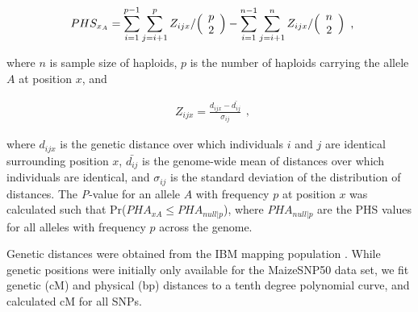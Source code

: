 \begin{equation}
  \label{phs-1}
  \begin{array}{l}
  \displaystyle{
PHS_{x_A} = \sum^{p-1}_{i=1}\sum^{p}_{j=i+1}Z_{ijx}  / \Bigl( \begin{array}{c} p \\ 2 \\ \end{array} \Bigr) 
- \sum^{n-1}_{i=1}\sum^{n}_{j=i+1}Z_{ijx}  / \Bigl( \begin{array}{c} n \\ 2 \\ \end{array} \Bigr) 
  }
  \end {array} 
  \textrm{,}
\end{equation}

\noindent where $n$ is sample size of haploids, $p$  is the number of haploids carrying the allele $A$ at position $x$, and

\begin{equation}
  \label{phs-2}
  \begin{array}{l}
  \displaystyle{
Z_{ijx} = \frac{ d_{ijx} - \bar{d_{ij}} }{ \sigma_{ij} }
  }
  \end {array} 
  \textrm{,}
\end{equation}

\noindent where $d_{ijx}$ is the genetic distance over which individuals $i$ and $j$ are identical surrounding position $x$, $\bar{d_{ij}}$ is the genome-wide mean of distances over which individuals are identical, and $\sigma_{ij}$ is the standard deviation of the distribution of distances.  
The \emph{P}-value for an allele $A$ with frequency $p$ at position $x$ was calculated such that Pr($PHA_{xA}\leq PHA_{null|p}$), where $PHA_{null|p}$ are the PHS values for all alleles with frequency $p$ across the genome. 

Genetic distances were obtained from the IBM mapping population \cite[]{Ganal_2011_22174790}.  
While genetic positions were initially only available for the MaizeSNP50 data set, we fit genetic (cM) and physical (bp) distances to a tenth degree polynomial curve, and calculated cM for all SNPs. 
 
